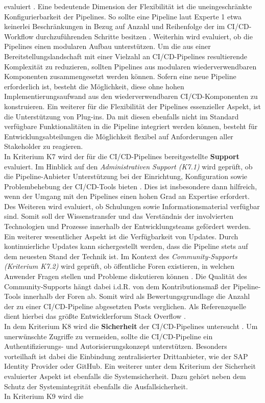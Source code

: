 evaluiert \cite[Z. 70 ff.]{ProductOwnerSAPBTPProd&Infra.}. Eine bedeutende Dimension der Flexibilität ist die uneingeschränkte Konfigurierbarkeit der Pipelines. So sollte eine Pipeline laut Experte 1 etwa keinerlei Beschränkungen in Bezug auf Anzahl und Reihenfolge der im CI/CD-Workflow durchzuführenden Schritte besitzen \cite[Z. 70 ff.]{ProductOwnerSAPBTPProd&Infra.}. Weiterhin wird evaluiert, ob die Pipelines einen modularen Aufbau unterstützen. Um die aus einer Bereitstellungslandschaft mit einer Vielzahl an CI/CD-Pipelines resultierende Komplexität zu reduzieren, sollten Pipelines aus modularen wiederverwendbaren Komponenten zusammengesetzt werden können. Sofern eine neue Pipeline erforderlich ist, besteht die Möglichkeit, diese ohne hohen Implementierungsaufwand aus den wiederverwendbaren CI/CD-Komponenten zu konstruieren. Ein weiterer für die Flexibilität der Pipelines essenzieller Aspekt, ist die Unterstützung von Plug-ins. Da mit diesen ebenfalls nicht im Standard verfügbare Funktionalitäten in die Pipeline integriert werden können, besteht für Entwicklungsabteilungen die Möglichkeit flexibel auf Anforderungen aller Stakeholder zu reagieren.\\ In Kriterium K7 wird der für die CI/CD-Pipelines bereitgestellte \textbf{Support} evaluiert. Im Hinblick auf den \textit{Administrativen Support (K7.1)} wird geprüft, ob die Pipeline-Anbieter Unterstützung bei der Einrichtung, Konfiguration sowie Problembehebung der CI/CD-Tools bieten \cite[Z. 44 ff.]{ProductManagerSAPHyperspaceCICD.}. Dies ist insbesondere dann hilfreich, wenn der Umgang mit den Pipelines einen hohen Grad an Expertise erfordert. Des Weiteren wird evaluiert, ob Schulungen sowie Informationsmaterial verfügbar sind. Somit soll der Wissenstransfer und das Verständnis der involvierten Technologien und Prozesse innerhalb der Entwicklungsteams gefördert werden. Ein weiterer wesentlicher Aspekt ist die Verfügbarkeit von Updates. Durch kontinuierliche Updates kann sichergestellt werden, dass die Pipeline stets auf dem neuesten Stand der Technik ist. Im Kontext des \textit{Community-Supports (Kriterium K7.2)} wird geprüft, ob öffentliche Foren existieren, in welchen Anwender Fragen stellen und Probleme diskutieren können \cite[Z. 46 ff.]{ProductManagerSAPHyperspaceCICD.}. Die Qualität des Community-Supports hängt dabei i.d.R. von dem Kontributionsmaß der Pipeline-Tools innerhalb der Foren ab. Somit wird als Bewertungsgrundlage die Anzahl der zu einer CI/CD-Pipeline abgesetzten Posts verglichen. Als Referenzquelle dient hierbei das größte Entwicklerforum Stack Overflow \cite{StackOverflow.20230403}.\\ In dem Kriterium K8 wird die \textbf{Sicherheit} der CI/CD-Pipelines untersucht \cite[Z. 79 ff.]{ProductOwnerSAPBTPProd&Infra.}. Um unerwünschte Zugriffe zu vermeiden, sollte die CI/CD-Pipeline ein Authentifizierungs- und Autorisierungskonzept unterstützen. Besonders vorteilhaft ist dabei die Einbindung zentralisierter Drittanbieter, wie der SAP Identity Provider oder GitHub. Ein weiterer unter dem Kriterium der Sicherheit evaluierter Aspekt ist ebenfalls die Systemsicherheit. Dazu gehört neben dem Schutz der Systemintegrität ebenfalls die Ausfallsicherheit.\\ In Kriterium K9 wird die 